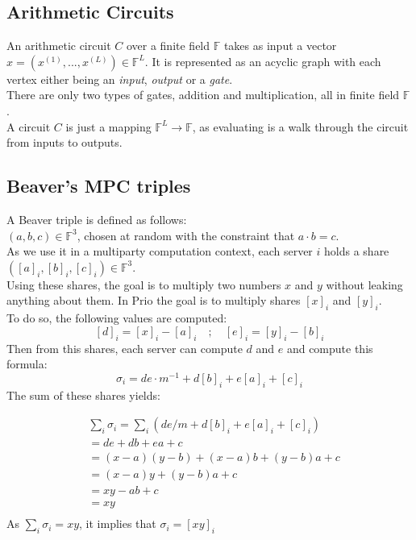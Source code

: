 \documentclass{article}
\begin{document}
\subsection*{Arithmetic Circuits}
An arithmetic circuit $C$ over a finite field $\mathbb{F}$ takes as input a vector $x = (x^{(1)},...,x^{(L)}) \in \mathbb{F}^L $. It is represented as an acyclic graph with each vertex either being an \textit{input}, \textit{output} or a \textit{gate}.\\
There are only two types of gates, addition and multiplication, all in finite field $\mathbb{F}$.\\
A circuit $C$ is just a mapping $\mathbb{F}^L \rightarrow \mathbb{F}$, as evaluating is a walk through the circuit from inputs to outputs.

\subsection*{Beaver's MPC triples}
A Beaver triple is defined as follows:\\
$(a,b,c) \in \mathbb{F}^3$, chosen at random with the constraint that $a \cdot b = c$.\\
As we use it in a multiparty computation context, each server $i$ holds a share $([a]_i , [b]_i , [c]_i) \in \mathbb{F}^3$.\\
Using these shares, the goal is to multiply two numbers $x$ and $y$ without leaking anything about them. In Prio the goal is to multiply shares $[x]_i$ and $[y]_i$.\\
To do so, the following values are computed:
$$[d]_i = [x]_i -[a]_i  \quad  ;  \quad  [e]_i = [y]_i - [b]_i$$ 
Then from this shares, each server can compute $d$ and $e$ and compute this formula:\\
$$\sigma_i = de \cdot m^{-1} + d[b]_i +e[a]_i + [c]_i$$
The sum of these shares yields:

\begin{equation}
\begin{split}
& \sum_{i} \sigma_i = \sum_{i}{(de/m +d[b]_i + e[a]_i + [c]_i)}\\
 & = de +db +ea + c\\
 & = (x-a)(y-b)+ (x-a)b + (y-b)a + c\\
 & = (x-a)y + (y-b)a + c\\
 & = xy -ab + c\\
 & = xy\\
\end{split}
\end{equation}
As $\sum_{i} \sigma_i = xy$, it implies that $\sigma_i = [xy]_i$ 
\end{document}
